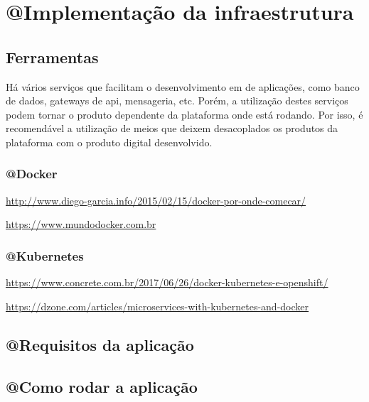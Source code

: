 \chapter{@Implementação da infraestrutura}\label{implementação-da-infraestrutura}

\section{Ferramentas}\label{ferramentas}


Há vários serviços que facilitam o desenvolvimento em de aplicações, como banco de dados,
gateways de api, mensageria, etc. Porém, a utilização destes serviços podem
tornar o produto dependente da plataforma onde está rodando. Por isso, é recomendável
a utilização de meios que deixem desacoplados os produtos da plataforma com o produto
digital desenvolvido.

\subsection{@Docker}\label{docker}

\url{http://www.diego-garcia.info/2015/02/15/docker-por-onde-comecar/}

\url{https://www.mundodocker.com.br}

\subsection{@Kubernetes}\label{kubernetes}

\url{https://www.concrete.com.br/2017/06/26/docker-kubernetes-e-openshift/}

\url{https://dzone.com/articles/microservices-with-kubernetes-and-docker}



\section{@Requisitos da aplicação}\label{requisitos-da-aplicacao}


\section{@Como rodar a aplicação}\label{como-rodar-a-aplicacao}







